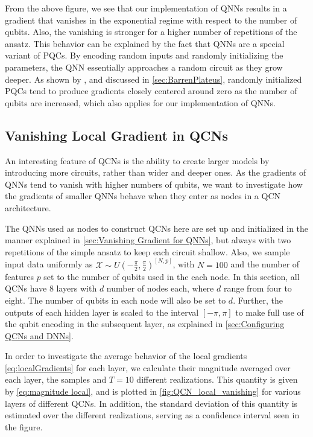 From the above figure, we see that our implementation of QNNs results in a gradient that vanishes in the exponential regime with respect to the number of qubits. Also, the vanishing is stronger for a higher number of repetitions of the ansatz. This behavior can be explained by the fact that QNNs are a special variant of PQCs. By encoding random inputs and randomly initializing the parameters, the QNN essentially approaches a random circuit as they grow deeper. As shown by \citet{McClean_2018}, and discussed in \autoref{sec:BarrenPlateus}, randomly initialized PQCs tend to produce gradients closely centered around zero as the number of qubits are increased, which also applies for our implementation of QNNs.  

\subsection{Vanishing Local Gradient in QCNs}\label{sec:Vanishing Local Gradients in QCNs}

An interesting feature of QCNs is the ability to create larger models by introducing more circuits, rather than wider and deeper ones. As the gradients of QNNs tend to vanish with higher numbers of qubits, we want to investigate how the gradients of smaller QNNs behave when they enter as nodes in a QCN architecture.

The QNNs used as nodes to construct QCNs here are set up and initialized in the manner explained in \autoref{sec:Vanishing Gradient for QNNs}, but always with two repetitions of the simple ansatz to keep each circuit shallow. Also, we sample input data uniformly as $\mathcal{X} \sim U(-\frac{\pi}{2}, \frac{\pi}{2})^{[N,p]}$, with $N=100$ and the number of features $p$ set to the number of qubits used in the each node. In this section, all QCNs have 8 layers with $d$ number of nodes each, where $d$ range from four to eight. The number of qubits in each node will also be set to $d$. Further, the outputs of each hidden layer is scaled to the interval $[-\pi, \pi]$ to make full use of the qubit encoding in the subsequent layer, as explained in \autoref{sec:Configuring QCNs and DNNs}.

In order to investigate the average behavior of the local gradients \autoref{eq:localGradients} for each layer, we calculate their magnitude averaged over each layer, the samples and $T = 10$ different realizations. This quantity is given by \autoref{eq:magnitude local}, and is plotted in \autoref{fig:QCN_local_vanishing} for various layers of different QCNs. In addition, the standard deviation of this quantity is estimated over the different realizations, serving as a confidence interval seen in the figure. 

